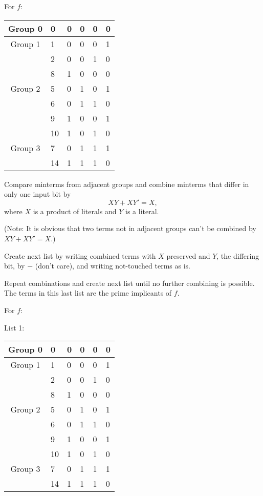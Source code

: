 \documentclass[a4paper,12pt]{article}
\begin{document}
\begin{itemize}
\begin{itemize}
\begin{itemize}
\begin{itemize}
\begin{itemize}
\begin{itemize}
\begin{itemize}
For $f$:
\begin{longtable}[c]{|c|m|mmmm|}
\hline
Group 0 & 0 & 0 & 0 & 0 & 0 \\\hline
Group 1 & 1 & 0 & 0 & 0 & 1 \\\cline{2-6}
& 2 & 0 & 0 & 1 & 0 \\\cline{2-6}
& 8 & 1 & 0 & 0 & 0 \\\hline
Group 2 & 5 & 0 & 1 & 0 & 1 \\\cline{2-6}
& 6 & 0 & 1 & 1 & 0 \\\cline{2-6}
& 9 & 1 & 0 & 0 & 1 \\\cline{2-6}
& 10 & 1 & 0 & 1 & 0 \\\hline
Group 3 & 7 & 0 & 1 & 1 & 1 \\\cline{2-6}
& 14 & 1 & 1 & 1 & 0 \\\hline
\end{longtable}
Compare minterms from adjacent groups and combine minterms that differ in only one input bit by
\[XY+XY'=X,\]
where $X$ is a product of literals and $Y$ is a literal.

(Note: It is obvious that two terms not in adjacent groups can't be combined by $XY+XY'=X$.)

Create next list by writing combined terms with $X$ preserved and $Y$, the differing bit, by $-$ (don't care), and writing not-touched terms as is.

Repeat combinations and create next list until no further combining is possible. The terms in this last list are the prime implicants of $f$.

For $f$:

List 1:
\begin{longtable}[c]{|c|m|mmmm|}
\hline
Group 0 & 0 & 0 & 0 & 0 & 0 \\\hline
Group 1 & 1 & 0 & 0 & 0 & 1 \\\cline{2-6}
& 2 & 0 & 0 & 1 & 0 \\\cline{2-6}
& 8 & 1 & 0 & 0 & 0 \\\hline
Group 2 & 5 & 0 & 1 & 0 & 1 \\\cline{2-6}
& 6 & 0 & 1 & 1 & 0 \\\cline{2-6}
& 9 & 1 & 0 & 0 & 1 \\\cline{2-6}
& 10 & 1 & 0 & 1 & 0 \\\hline
Group 3 & 7 & 0 & 1 & 1 & 1 \\\cline{2-6}
& 14 & 1 & 1 & 1 & 0 \\\hline
\end{longtable}


\end{itemize}
\end{itemize}
\end{itemize}
\end{itemize}
\end{itemize}
\end{itemize}
\end{itemize}
\end{document}
